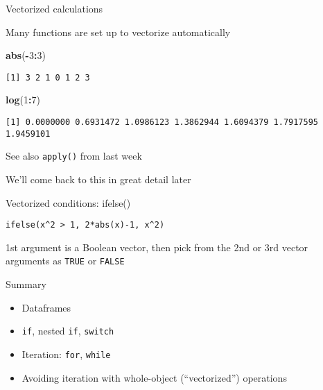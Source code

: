 \documentclass[8pt,ignorenonframetext,]{beamer}
\newenvironment{Shaded}{\begin{snugshade}}{\end{snugshade}}
\newcommand{\KeywordTok}[1]{\textcolor[rgb]{0.13,0.29,0.53}{\textbf{#1}}}
\newcommand{\DecValTok}[1]{\textcolor[rgb]{0.00,0.00,0.81}{#1}}
\newcommand{\OperatorTok}[1]{\textcolor[rgb]{0.81,0.36,0.00}{\textbf{#1}}}
\newcommand{\NormalTok}[1]{#1}
\providecommand{\tightlist}{%
  \setlength{\itemsep}{0pt}\setlength{\parskip}{0pt}}
\begin{document}
\begin{frame}[fragile]{Vectorized calculations}

Many functions are set up to vectorize automatically

\begin{Shaded}
\begin{Highlighting}[]
\KeywordTok{abs}\NormalTok{(}\OperatorTok{-}\DecValTok{3}\OperatorTok{:}\DecValTok{3}\NormalTok{)}
\end{Highlighting}
\end{Shaded}

\begin{verbatim}
[1] 3 2 1 0 1 2 3
\end{verbatim}

\begin{Shaded}
\begin{Highlighting}[]
\KeywordTok{log}\NormalTok{(}\DecValTok{1}\OperatorTok{:}\DecValTok{7}\NormalTok{)}
\end{Highlighting}
\end{Shaded}

\begin{verbatim}
[1] 0.0000000 0.6931472 1.0986123 1.3862944 1.6094379 1.7917595 1.9459101
\end{verbatim}

See also \texttt{apply()} from last week

We'll come back to this in great detail later

\end{frame}

\begin{frame}[fragile]{Vectorized conditions: ifelse()}

\begin{verbatim}
ifelse(x^2 > 1, 2*abs(x)-1, x^2)
\end{verbatim}

1st argument is a Boolean vector, then pick from the 2nd or 3rd vector
arguments as \texttt{TRUE} or \texttt{FALSE}

\end{frame}

\begin{frame}[fragile]{Summary}

\begin{itemize}
\tightlist
\item
  Dataframes
\item
  \texttt{if}, nested \texttt{if}, \texttt{switch}
\item
  Iteration: \texttt{for}, \texttt{while}
\item
  Avoiding iteration with whole-object (``vectorized'') operations
\end{itemize}

\end{frame}
\end{document}
